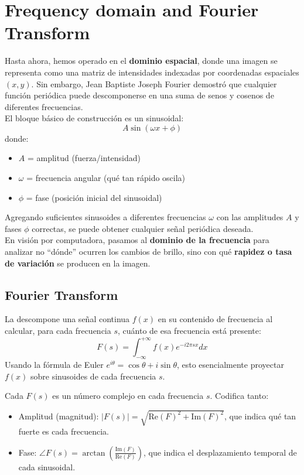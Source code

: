 \chapter{Frequency domain and Fourier Transform}
\noindent
Hasta ahora, hemos operado en el \textbf{dominio espacial}, donde una imagen se representa como una matriz de intensidades indexadas por coordenadas espaciales $(x, y)$. Sin embargo, Jean Baptiste Joseph Fourier demostró que cualquier función periódica puede descomponerse en una suma de senos y cosenos de diferentes frecuencias. \\

\noindent
El bloque básico de construcción es un sinusoidal:
$$A \sin(\omega x + \phi)$$
donde:
\begin{itemize}
    \item $A$ = amplitud (fuerza/intensidad)
    \item $\omega$ = frecuencia angular (qué tan rápido oscila)
    \item $\phi$ = fase (posición inicial del sinusoidal)
\end{itemize}
Agregando suficientes sinusoides a diferentes frecuencias $\omega$ con las amplitudes $A$ y fases $\phi$ correctas, se puede obtener cualquier señal periódica deseada. \\ 

\noindent
En visión por computadora, pasamos al \textbf{dominio de la frecuencia} para analizar no ``dónde'' ocurren los cambios de brillo, sino con qué \textbf{rapidez o tasa de variación} se producen en la imagen.


\section{Fourier Transform}
\begin{definicion}
    La  descompone una señal continua $f(x)$ en su contenido de frecuencia al calcular, para cada frecuencia $s$, cuánto de esa frecuencia está presente:
    $$F(s) = \int_{-\infty}^{+\infty} f(x) e^{-i2\pi sx} dx$$
    Usando la fórmula de Euler $e^{i\theta} = \cos \theta + i \sin \theta$, esto esencialmente proyectar $f(x)$ sobre sinusoides de cada frecuencia $s$.
\end{definicion}

\noindent
Cada $F(s)$ es un número complejo en cada frecuencia $s$. Codifica tanto:
\begin{itemize}
    \item Amplitud (magnitud): $|F(s)| = \sqrt{\text{Re}(F)^2 + \text{Im}(F)^2}$, que indica qué tan fuerte es cada frecuencia.
    \item Fase: $\angle F(s) = \arctan \left( \frac{\text{Im}(F)}{\text{Re}(F)} \right)$, que indica el desplazamiento temporal de cada sinusoidal.
\end{itemize}

